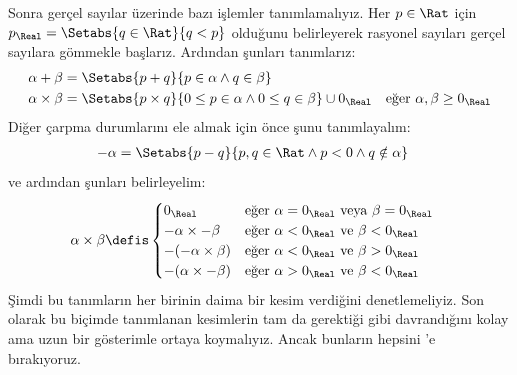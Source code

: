 \documentclass[../../../include/open-logic-section]{subfiles}
\begin{document}
Sonra gerçel sayılar üzerinde bazı işlemler tanımlamalıyız. Her $p \in \Rat$
için $p_\Real = \Setabs{q \in \Rat}{q < p}$ olduğunu belirleyerek rasyonel
sayıları gerçel sayılara gömmekle başlarız. Ardından şunları tanımlarız:
\begin{align*}
	\alpha + \beta &= \Setabs{p + q}{p \in \alpha \land q \in \beta}\\
	\alpha \times \beta &=
	\Setabs{p \times q}{0 \leq p \in \alpha \land 0 \leq q \in \beta} \cup 0_\Real & \text{eğer }\alpha, \beta \geq 0_\Real
\end{align*}
Diğer çarpma durumlarını ele almak için önce şunu tanımlayalım:
\begin{align*}
	-\alpha &= \Setabs{p - q}{p,q \in \Rat \land p < 0 \land q \notin \alpha}
\end{align*}
ve ardından şunları belirleyelim:
\begin{align*}
	\alpha \times \beta &\defis
	\begin{cases}
		0_\Real &\text{eğer }\alpha = 0_\Real\text{ veya }\beta = 0_\Real\\
		\mathord{-}\alpha \times \mathord{-}\beta &\text{eğer }\alpha < 0_\Real\text{ ve }\beta < 0_\Real\\
		\mathord{-}(\mathord{-}\alpha \times \beta) &\text{eğer }\alpha < 0_\Real \text{ ve }\beta > 0_\Real\\
		\mathord{-}(\alpha \times \mathord{-}\beta) &\text{eğer }\alpha > 0_\Real \text{ ve }\beta < 0_\Real
	\end{cases}
\end{align*}
Şimdi bu tanımların her birinin daima bir kesim verdiğini denetlemeliyiz. Son
olarak bu biçimde tanımlanan kesimlerin tam da gerektiği gibi davrandığını
kolay ama uzun bir gösterimle ortaya koymalıyız. Ancak bunların hepsini
'e bırakıyoruz.
\end{document}

